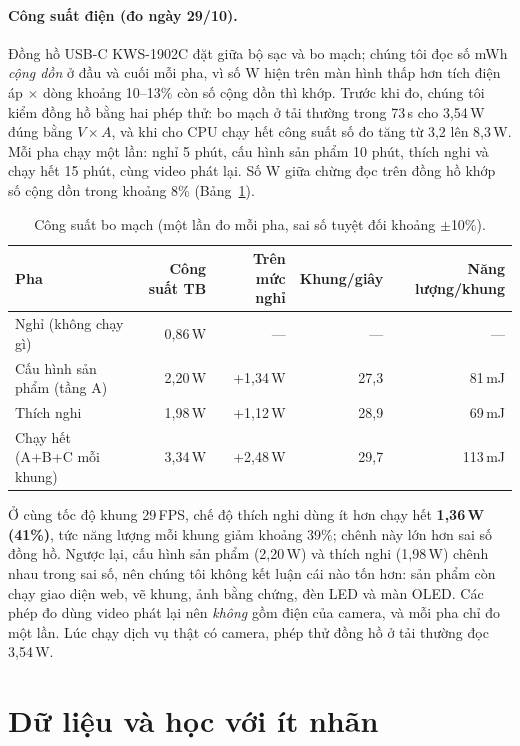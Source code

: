 \documentclass[12pt,a4paper]{article}
\begin{document}
\paragraph{Công suất điện (đo ngày 29/10).}
Đồng hồ USB-C KWS-1902C đặt giữa bộ sạc và bo mạch; chúng tôi đọc số mWh \emph{cộng dồn} ở đầu và cuối mỗi pha, vì số W hiện
trên màn hình thấp hơn tích điện áp $\times$ dòng khoảng 10--13\% còn số cộng dồn thì khớp. Trước khi đo, chúng tôi kiểm đồng hồ
bằng hai phép thử: bo mạch ở tải thường trong 73\,s cho 3,54\,W đúng bằng $V\times A$, và khi cho CPU chạy hết công suất số đo tăng
từ 3,2 lên 8,3\,W. Mỗi pha chạy một lần: nghỉ 5 phút, cấu hình sản phẩm 10 phút, thích nghi và chạy hết 15 phút, cùng video phát lại.
Số W giữa chừng đọc trên đồng hồ khớp số cộng dồn trong khoảng 8\% (Bảng~\ref{tab:power}).

\begin{table}[ht]
\centering
\caption{Công suất bo mạch (một lần đo mỗi pha, sai số tuyệt đối khoảng $\pm$10\%).}
\label{tab:power}
\begin{tabular}{lrrrr}
\toprule
Pha & Công suất TB & Trên mức nghỉ & Khung/giây & Năng lượng/khung \\
\midrule
Nghỉ (không chạy gì) & 0,86\,W & --- & --- & --- \\
Cấu hình sản phẩm (tầng A) & 2,20\,W & +1,34\,W & 27,3 & 81\,mJ \\
Thích nghi & 1,98\,W & +1,12\,W & 28,9 & 69\,mJ \\
Chạy hết (A+B+C mỗi khung) & 3,34\,W & +2,48\,W & 29,7 & 113\,mJ \\
\bottomrule
\end{tabular}
\end{table}

Ở cùng tốc độ khung 29\,FPS, chế độ thích nghi dùng ít hơn chạy hết \textbf{1,36\,W (41\%)}, tức năng lượng mỗi khung giảm khoảng 39\%;
chênh này lớn hơn sai số đồng hồ. Ngược lại, cấu hình sản phẩm (2,20\,W) và thích nghi (1,98\,W) chênh nhau trong sai số, nên chúng tôi
không kết luận cái nào tốn hơn: sản phẩm còn chạy giao diện web, vẽ khung, ảnh bằng chứng, đèn LED và màn OLED. Các phép đo dùng video
phát lại nên \emph{không} gồm điện của camera, và mỗi pha chỉ đo một lần. Lúc chạy dịch vụ thật có camera, phép thử đồng hồ ở tải thường đọc 3,54\,W.

\section{Dữ liệu và học với ít nhãn}
\end{document}
